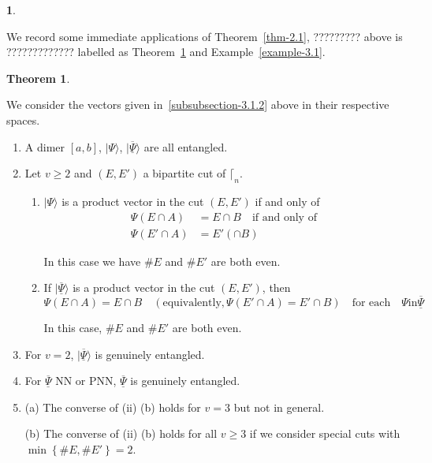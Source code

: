 \documentclass[a4paper,12pt]{article}
\theoremstyle{definition}
\theoremstyle{underlinethm}
\newtheorem{thm}{Theorem}[section]
\theoremstyle{underline}
\newtheorem{subsubsec}{}[subsection]
\begin{document}
\begin{subsubsec}
\begin{enumerate}[label=(\alph*)]
We record some immediate applications of Theorem~\ref{thm-2.1}, ????????? above is ????????????? labelled as Theorem~\ref{thm-3.1} and Example~\ref{example-3.1}.

\end{enumerate}

\end{subsubsec}

\begin{thm}\label{thm-3.1}

We consider the vectors given in~\ref{subsubsection-3.1.2} above in their respective spaces.

\begin{enumerate}[label=(\roman*)]

\item A dimer $[a, b]$, $| \Psi \rangle$, $| \underline{\overline{\Psi}} \rangle$ are all entangled.

\item Let $v \geq 2$ and $(E, E')$ a  bipartite cut of $\lceil_{n}$.

   \begin{enumerate}[label=(\alph*)]
    \item $| \Psi \rangle$ is a product vector in the cut $(E, E')$ if and only of 
			\begin{align*}
			\Psi(E \cap A) &= E \cap B \quad \text{if and only of}\\
			\Psi(E' \cap A) &= E'(\cap B) \tag{3.7}\label{eq-3.7}
			\end{align*}
			
	 In this case we have $\# E$ and $\# E'$ are both even.
	 \item If $| \underline{\overline{\Psi}} \rangle$ is a product vector in the cut $(E, E')$, then 
	 		\begin{equation}
	 		 \Psi(E \cap A) = E \cap B \quad ({\text {equivalently}}, \Psi (E' \cap A) = E' \cap B)\quad \text{for each}\quad \Psi \text{in} \underline{\overline{\Psi}}\tag{3.8}\label{eq-3.8}   
	 		\end{equation}
	 		
	 	In this case, $\# E$ and $\# E'$ are both even.	
    \end{enumerate}
    
   \item For $v=2$, $| \underline{\overline{\Psi}} \rangle$ is genuinely entangled.
   
   \item For $\underline{\overline{\Psi}} $ NN or PNN, $\underline{\overline{\Psi}}$ is genuinely entangled.
   
   \item (a) The converse of (ii) (b) holds for $v=3$ but not in general.
   
   (b) The converse of (ii) (b) holds for all $v \geq 3$ if we consider special cuts with $\min \left\{ \# E, \# E' \right\} = 2$.
\end{enumerate}
\end{thm}
\end{document}
